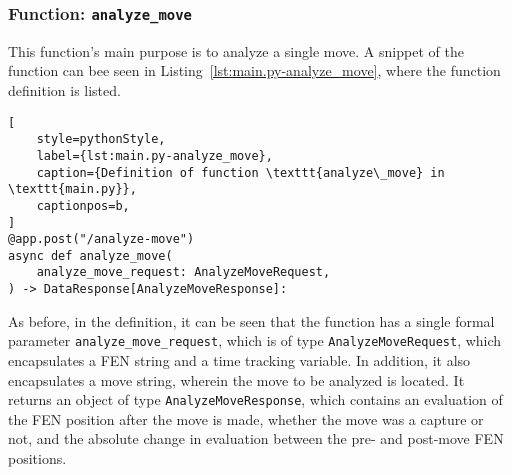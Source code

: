 \subsubsection{Function: \texttt{analyze\_move}}\label{subsubsec:function:analyze_move}

This function's main purpose is to analyze a single move.
A snippet of the function can bee seen in Listing~\ref{lst:main.py-analyze_move}, where the function definition is
listed.

\begin{lstlisting}[
    style=pythonStyle,
    label={lst:main.py-analyze_move},
    caption={Definition of function \texttt{analyze\_move} in \texttt{main.py}},
    captionpos=b,
]
@app.post("/analyze-move")
async def analyze_move(
    analyze_move_request: AnalyzeMoveRequest,
) -> DataResponse[AnalyzeMoveResponse]:
\end{lstlisting}

As before, in the definition, it can be seen that the function has a single formal parameter
\texttt{analyze\_move\_request}, which is of type \texttt{AnalyzeMoveRequest}, which encapsulates a FEN string and a
time tracking variable.
In addition, it also encapsulates a move string, wherein the move to be analyzed is located.
It returns an object of type \texttt{AnalyzeMoveResponse}, which contains an evaluation of the FEN position after the
move is made, whether the move was a capture or not, and the absolute change in evaluation between the pre- and
post-move FEN positions.
